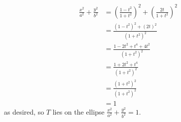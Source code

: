 \Question{\currfilebase}

\begin{align*}
    \frac{x^2}{a^2} + \frac{y^2}{b^2} & = \left(\frac{1-t^2}{1+t^2}\right)^2 + \left(\frac{2t}{1+t^2}\right)^2      \\
                                      & = \frac{\left(1 - t^2\right)^2 + \left(2t\right)^2}{\left(1 + t^2\right)^2} \\
                                      & = \frac{1 - 2t^2 + t^4 + 4t^2}{\left(1 + t^2\right)^2}                      \\
                                      & = \frac{1 + 2t^2 + t^4}{\left(1 + t^2\right)^2}                             \\
                                      & = \frac{\left(1 + t^2\right)^2}{\left(1 + t^2\right)^2}                     \\
                                      & = 1
\end{align*}
as desired, so \(T\) lies on the ellipse \(\frac{x^2}{a^2} + \frac{y^2}{b^2} = 1\).

